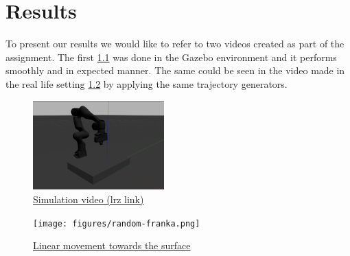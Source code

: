 \chapter{Results}\label{results}

To present our results we would like to refer to two videos created as part of the assignment. The first \ref{fig:franka-sim} was done in the Gazebo environment and it performs smoothly and in expected manner. The same could be seen in the video made in the real life setting \ref{fig:franka-real} by applying the same trajectory generators. 


\begin{figure}[htpb]
    \centering
    \includegraphics[width=0.45\textwidth]{figures/franka-sim.png}
    \caption{\href{https://gitlab.lrz.de/tum-impl-ss24/assignment2-group1/-/blob/main/media/content/gazebo-whiteboard-task-simulation.mov}{Simulation video (lrz link)}}
    \label{fig:franka-sim}
\end{figure}
\begin{figure}[htpb]
    \centering
    \texttt{[image: figures/random-franka.png]}
    \caption{\href{https://gitlab.lrz.de/tum-impl-ss24/assignment2-group1/-/raw/main/media/content/cleaning-whiteboard-task.mp4}{Linear movement towards the surface}}
    \label{fig:franka-real}
\end{figure}